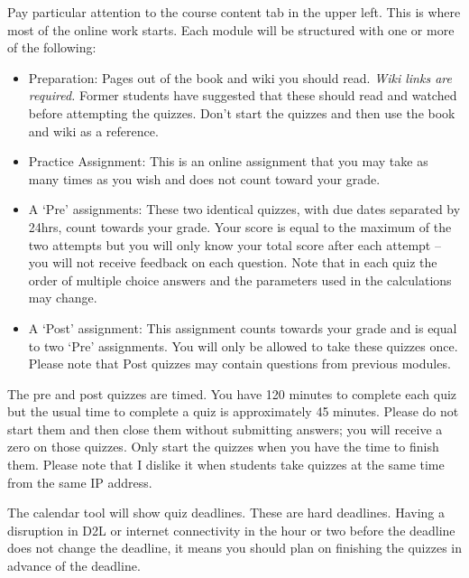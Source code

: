 \documentclass[letterpaper,10pt]{article}
\begin{document}
Pay particular attention to the course content tab in the upper
left. This is where most of the online work starts.  Each module will
be structured with one or more of the following:


\begin{itemize}
\item Preparation: Pages out of the book and wiki you should read.
  \emph{Wiki links are required.}  Former students have suggested that these should read and watched before attempting the quizzes.  Don't start the quizzes and then use the book and wiki as a reference.
  
\item Practice Assignment: This is an online assignment that you
     may take as many times as you wish and does not count toward
     your grade.
\item A `Pre' assignments: These two identical quizzes, with due dates separated by 24hrs, count towards your grade.
  Your score is equal
  to the maximum of the two attempts but you will only know your total score after each attempt -- you will not receive feedback on each question. Note that in each quiz the order of multiple choice answers and the parameters used in the calculations may change.

\item A `Post' assignment: This assignment counts
  towards your grade and is equal to two `Pre' assignments.  You will
  only be allowed to take these quizzes once.  Please note that Post quizzes may contain questions from previous modules.

 
\end{itemize}

 The pre and post quizzes are timed. You have 120 minutes to complete each quiz but the usual time to complete a quiz is approximately 45 minutes.  Please do not start them and
  then close them without submitting answers; you will receive a zero on those quizzes.  Only start the quizzes when you have the time to
  finish them.  Please note that I dislike it when students take
  quizzes at the same time from the same IP address.






The calendar tool will show quiz deadlines. These are hard deadlines.  Having a disruption in D2L or internet connectivity in the hour or two before the deadline does not change the deadline, it means you should plan on finishing the quizzes in advance of the deadline.
\end{document}

